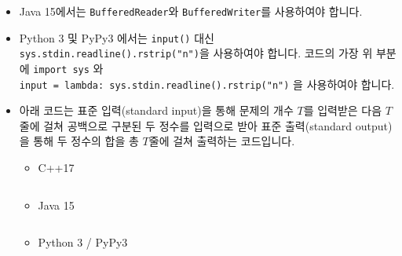 \begin{itemize}[noitemsep]
    \item Java 15에서는 \texttt{BufferedReader}와 \texttt{BufferedWriter}를 사용하여야 합니다.
    
    \item Python 3 및 PyPy3 에서는 \texttt{input()} 대신 \texttt{sys.stdin.readline().rstrip("n")}을 사용하여야 합니다. 코드의 가장 위 부분에 \texttt{import sys} 와\\
    \texttt{input = lambda: sys.stdin.readline().rstrip("n")} 을 사용하여야 합니다.
    
    \item 아래 코드는 표준 입력(standard input)을 통해 문제의 개수 $T$를 입력받은 다음 $T$줄에 걸쳐 공백으로 구분된 두 정수를 입력으로 받아 표준 출력(standard output)을 통해 두 정수의 합을 총 $T$줄에 걸쳐 출력하는 코드입니다.

    \begin{itemize}[noitemsep]
        \item C++17%
        \inputminted[frame=lines,baselinestretch=1.2,linenos]{cpp}{rule-example-code/cpp17-15552.cpp}
        \item Java 15%
        \inputminted[frame=lines,baselinestretch=1.2,linenos]{java}{rule-example-code/java-15552.java}
        \item Python 3 / PyPy3%
        \inputminted[frame=lines,baselinestretch=1.2,linenos]{python}{rule-example-code/py3-15552.py}
    \end{itemize}
	
\end{itemize}